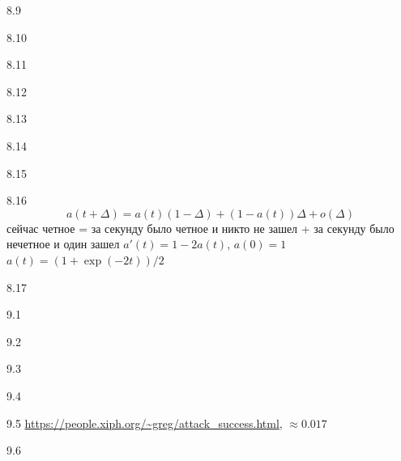 \protect \hypertarget {soln:8.9}{}
\begin{solution}{{8.9}}
\end{solution}
\protect \hypertarget {soln:8.10}{}
\begin{solution}{{8.10}}
\end{solution}
\protect \hypertarget {soln:8.11}{}
\begin{solution}{{8.11}}
\end{solution}
\protect \hypertarget {soln:8.12}{}
\begin{solution}{{8.12}}
\end{solution}
\protect \hypertarget {soln:8.13}{}
\begin{solution}{{8.13}}
\end{solution}
\protect \hypertarget {soln:8.14}{}
\begin{solution}{{8.14}}
\end{solution}
\protect \hypertarget {soln:8.15}{}
\begin{solution}{{8.15}}
\end{solution}
\protect \hypertarget {soln:8.16}{}
\begin{solution}{{8.16}}
  \[ a(t+\Delta)=a(t)(1-\Delta)+(1-a(t))\Delta + o(\Delta) \]
  сейчас четное = за секунду было четное и никто не зашел + за секунду было нечетное и один зашел
  $a'(t)=1-2a(t)$, $a(0)=1$
  $a(t)=(1+\exp(-2t))/2$
\end{solution}
\protect \hypertarget {soln:8.17}{}
\begin{solution}{{8.17}}
\end{solution}
\protect \hypertarget {soln:9.1}{}
\begin{solution}{{9.1}}
\end{solution}
\protect \hypertarget {soln:9.2}{}
\begin{solution}{{9.2}}
\end{solution}
\protect \hypertarget {soln:9.3}{}
\begin{solution}{{9.3}}
\end{solution}
\protect \hypertarget {soln:9.4}{}
\begin{solution}{{9.4}}
\end{solution}
\protect \hypertarget {soln:9.5}{}
\begin{solution}{{9.5}}
  \url{https://people.xiph.org/~greg/attack_success.html}, $\approx 0.017$
\end{solution}
\protect \hypertarget {soln:9.6}{}
\begin{solution}{{9.6}}
\end{solution}
